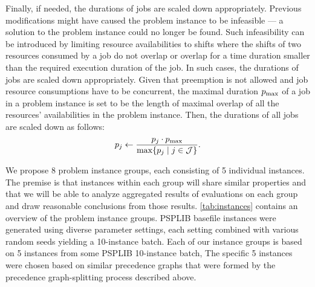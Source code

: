 Finally, if needed, the durations of jobs are scaled down appropriately.
Previous modifications might have caused the problem instance to be infeasible
--- a solution to the problem instance could no longer be found.
Such infeasibility can be introduced by limiting resource availabilities to shifts
where the shifts of two resources consumed by a job do not overlap
or overlap for a time duration smaller than the required execution duration of the job.
In such cases, the durations of jobs are scaled down appropriately.
Given that preemption is not allowed and job resource consumptions have to be concurrent,
the maximal duration $p_{\max}$ of a job in a problem instance is set
to be the length of maximal overlap of all the resources' availabilities in the problem instance.
Then, the durations of all jobs are scaled down as follows:
$$
\duration{j} \gets \frac{\duration{j} \cdot \duration{\max}}%
                        {\max\{\duration{j} \;|\; j \in \Jobs \}}.
$$

We propose 8 problem instance groups, each consisting of 5 individual instances.
The premise is that instances within each group will share similar properties
and that we will be able to analyze aggregated results of evaluations on each group
and draw reasonable conclusions from those results.
\cref{tab:instances} contains an overview of the problem instance groups.
PSPLIB basefile instances were generated using diverse parameter settings,
each setting combined with various random seeds yielding a 10-instance batch.
Each of our instance groups is based on 5 instances from some PSPLIB 10-instance batch,
The specific 5 instances were chosen based on similar precedence graphs
that were formed by the precedence graph-splitting process described above.

